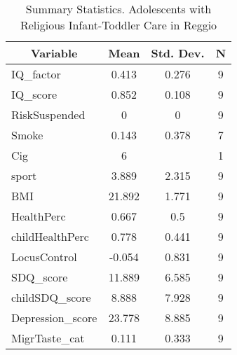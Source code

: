 
\begin{table}[htbp]\centering \caption{Summary Statistics. Adolescents with Religious Infant-Toddler Care in Reggio \label{bothAdolasiloReliReggio}}
\begin{tabular}{l c c  c}\hline\hline
\multicolumn{1}{c}{\textbf{Variable}} & \textbf{Mean}
 & \textbf{Std. Dev.} & \textbf{N}\\ \hline
IQ\_factor & 0.413 & 0.276  & 9\\
IQ\_score & 0.852 & 0.108  & 9\\
RiskSuspended & 0 & 0  & 9\\
Smoke & 0.143 & 0.378  & 7\\
Cig & 6 &   & 1\\
sport & 3.889 & 2.315  & 9\\
BMI & 21.892 & 1.771  & 9\\
HealthPerc & 0.667 & 0.5  & 9\\
childHealthPerc & 0.778 & 0.441  & 9\\
LocusControl & -0.054 & 0.831  & 9\\
SDQ\_score & 11.889 & 6.585  & 9\\
childSDQ\_score & 8.888 & 7.928  & 9\\
Depression\_score & 23.778 & 8.885  & 9\\
MigrTaste\_cat & 0.111 & 0.333  & 9\\
\hline\end{tabular}
\end{table}
